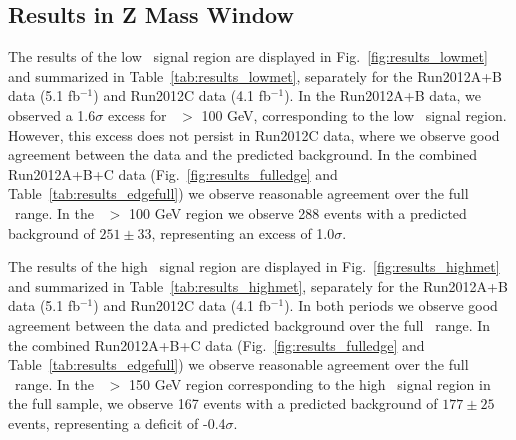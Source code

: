 \subsection{Results in Z Mass Window}

The results of the low \MET\ signal region are displayed in Fig.~\ref{fig:results_lowmet} and summarized in Table~\ref{tab:results_lowmet},
separately for the Run2012A+B data (5.1 fb$^{-1}$) and Run2012C data (4.1 fb$^{-1}$).
In the Run2012A+B data, we observed a 1.6$\sigma$ excess for \MET\ $>$ 100 GeV, corresponding to the low \MET\ signal region.
However, this excess does not persist in Run2012C data, where we observe good agreement between the data and the predicted background.
In the combined Run2012A+B+C data (Fig.~\ref{fig:results_fulledge} and Table~\ref{tab:results_edgefull}) we observe reasonable
agreement over the full \MET\ range. In the \MET\ $>$ 100 GeV region we observe 288 events with a predicted background of $251\pm33$,
representing an excess of 1.0$\sigma$.

The results of the high \MET\ signal region are displayed in Fig.~\ref{fig:results_highmet} and summarized in 
Table~\ref{tab:results_highmet},
separately for the Run2012A+B data (5.1 fb$^{-1}$) and Run2012C data (4.1 fb$^{-1}$).
In both periods we observe good agreement between the data and predicted background over the full \MET\ range.
In the combined Run2012A+B+C data (Fig.~\ref{fig:results_fulledge} and Table~\ref{tab:results_edgefull}) we observe reasonable
agreement over the full \MET\ range. 
In the \MET\ $>$ 150 GeV region corresponding to the high \MET\ signal region in the full sample, we observe 167 events with a predicted
background of $177\pm25$ events, representing a deficit of -0.4$\sigma$.

\clearpage

